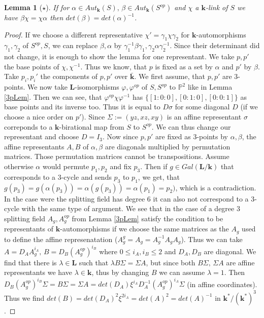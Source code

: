 \documentclass[12pt, oneside, reqno]{amsart}
\newtheorem{lemma}[theorem]{Lemma}
\begin{document}
\begin{lemma}[$\star$] \label{DetTrivRef}
    If for $\alpha \in Aut_{\textbf{k}}(S), \,  \beta \in Aut_{\textbf{k}}(S^{op})$ and $\chi$ a $\textbf{k}$-link of $S$ we have $\beta \chi = \chi \alpha$ then $det(\beta) = det(\alpha)^{-1}$.
\end{lemma}
\begin{proof}
    If we choose a different representative $\chi' = \gamma_1 \chi \gamma_2$ for $\textbf{k}$-automorphisms $\gamma_1, \gamma_2$ of $S^{op},S$, we can replace $\beta, \alpha$ by $\gamma_1^{-1} \beta \gamma_1, \gamma_2 \alpha \gamma_2^{-1}$. Since their determinant did not change, it is enough to show the lemma for one representant. We take $p,p'$ the base points of $\chi, \chi^{-1}$. Thus we know, that $p$ is fixed as a set by $\alpha$ and $p'$ by $\beta$. Take $p_i,p_i'$ the components of $p,p'$ over $\bar{\textbf{k}}$.  \newline
    We first assume, that $p,p'$ are $3$-points. We now take $\textbf{L}$-isomorphisms $\varphi, \varphi^{op}$ of $S,S^{op}$ to $\mathbb{P}^2$ like in Lemma \ref{3pLem}. Then we can see, that $\varphi^{op} \chi \varphi^{-1}$ has $\{ [1:0:0], [0:1:0], [0:0:1]\}$ as base points and its inverse too. Thus it is equal to $D \sigma$ for some diagonal $D$ (if we choose a nice order on $p'$). Since $\Sigma:= (yz,xz,xy)$ is an affine representant $\sigma$ correponds to a $\textbf{k}$-birational map from $S$ to $S^{op}$. We can thus change our representant and choose $D=I_3$. Now since $p,p'$ are fixed as $3$-points by $\alpha, \beta$, the affine representants $A,B$ of $\alpha, \beta$ are diagonals multiplied by permutation matrices. Those permutation matrices cannot be transpositions. Assume otherwise $\alpha$ would permute $p_1,p_2$ and fix $p_3$. Then if $g \in Gal(\textbf{L}/\textbf{k})$ that corresponds to a $3$-cycle and sends $p_3$ to $p_1$, we get, that $g(p_3) = g(\alpha(p_3)) = \alpha(g(p_3)) = \alpha(p_1) = p_2)$, which is a contradiction. In the case were the splitting field has degree $6$ it can also not correspond to a $3$-cycle with the same type of argument. We see that in the case of a degree $3$ splitting field $A_g, A_g^{op}$ from Lemma \ref{3pLem} satisfy the condition to be representants of $\textbf{k}$-automorphisms if we choose the same matrices as the $A_g$ used to define the affine represenatation ($A_g^g = A_g = A_g^{-1}A_g A_g$). Thus we can take $A = D_A A_g^{i_A}, \, B = D_B (A_g^{op})^{i_B}$ where $0 \leq i_A,i_B \leq 2$ and $D_A,D_B$ are diagonal. We find that there is $\lambda \in \textbf{L}$ such that $\lambda B  \Sigma =  \Sigma A$, but since both $ B  \Sigma , \, \Sigma A$ are affine representants we have $\lambda \in \textbf{k}$, thus by changing $B$ we can assume $\lambda = 1$. Then $D_B (A_g^{op})^{i_B} \Sigma = B  \Sigma =  \Sigma A = det(D_A) \xi^{i_A} D_A^{-1} (A_g^{op})^{i_A} \Sigma$ (in affine coordinates). Thus we find $det(B) = det(D_A)^2 \xi^{2i_A} = det(A)^2 = det(A)^{-1}$ in $\textbf{k}^*/(\textbf{k}^*)^3$. \newline

\end{proof}
\end{document}
